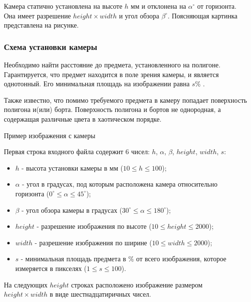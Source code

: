 
Камера статично установлена на высоте $h$ мм и отклонена на $\alpha^\circ$ от горизонта. Она имеет разрешение $height\times width$ и угол обзора $\beta^\circ$. Поясняющая картинка представлена на рисунке.


\subsubsection*{Схема установки камеры}

Необходимо найти расстояние до предмета, установленного на полигоне. Гарантируется, что предмет находится в поле зрения камеры, и является однотонный. Его минимальная площадь на изображении равна $s \%$ .

Также известно, что помимо требуемого предмета в камеру попадает поверхность полигона и(или) борта. Поверхность полигона и бортов не однородная, а содержащая различные цвета в хаотическом порядке.


Пример изображения с камеры


Первая строка входного файла содержит 6 чисел: $h$,  $\alpha$, $\beta$, $height$, $width$, $s$:

\begin{itemize}
    \item $h$ - высота установки камеры в мм ($10 \leq h \leq 100$);
    \item $\alpha$ - угол в градусах, под которым расположена камера относительно горизонта ($0^\circ \leq \alpha \leq 45^\circ$);
    \item $\beta$ - угол обзора камеры в градусах ($30^{\circ} \leq \alpha \leq 180^{\circ}$);
    \item $height$ -  разрешение изображения по высоте ($10 \leq height \leq 2000$);
    \item $width$ - разрешение изображения по ширине ($10 \leq width \leq 2000$);
    \item $s$ -  минимальная площадь предмета в $\% $ от всего изображения, которое измеряется в пикселях ($ 1 \leq s \leq 100 $).
\end{itemize}

На следующих $height$ строках расположено изображение размером $height\times width$ в виде шестнадцатиричных чисел.

